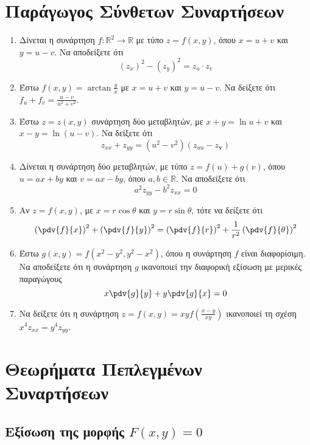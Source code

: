 \section{Παράγωγος Σύνθετων Συναρτήσεων} 

\begin{enumerate}
    \item Δίνεται η συνάρτηση $ f : \mathbb{R}^{2} \to \mathbb{R} $ με τύπο 
        $ z=f(x,y) $, όπου $ x=u+v $ και $ y = u-v $. Να αποδείξετε ότι 
        \[
            (z_{x})^{2} - (z_{y})^{2} = z_{u}\cdot z_{v} 
        \] 
    \item Έστω $ f(x,y) = \arctan{\frac{y}{x}} $ με $ x=u+v $ και $ y = u-v $. 
        Να δείξετε ότι $ f_{u} + f_{v} = \frac{u-v}{u^{2}+v^{2}} $.
    \item Έστω $ z=z(x,y) $ συνάρτηση δύο μεταβλητών, με $ x+y= \ln{u+v} $ και 
        $ x-y = \ln{(u-v)} $. Να δείξετε ότι 
        \[
            z_{xx}+z_{yy} = (u^{2}-v^{2})(z_{uu}-z_{\mathbf{v}}) 
        \]
    \item Δίνεται η συνάρτηση δύο μεταβλητών, με τύπο
        $ z = f(u) + g(v) $, όπου $ u = ax + by $ και $ v = ax - by $, όπου 
        $ a,b \in \mathbb{R} $. Να αποδείξετε ότι 
        \[
            a^{2} z_{yy} - b^{2}z_{xx} = 0 
        \] 
    \item Αν $ z = f(x,y) $, με $ x=r \cos{\theta} $ και $ y = r \sin{\theta} $, 
        τότε να δείξετε ότι
        \[
            \left(\pdv{f}{x}\right)^{2} + \left(\pdv{f}{y}\right)^{2} = 
            \left(\pdv{f}{r}\right)^{2} + \frac{1}{ r^{2}} 
            \left(\pdv{f}{\theta}\right)^{2} 
        \] 
    \item Έστω $ g(x,y) = f(x^{2} - y^{2}, y^{2} - x^{2}) $, όπου η συνάρτηση 
        $f$ είναι διαφορίσιμη. Να αποδείξετε ότι η συνάρτηση $g$ ικανοποιεί 
        την διαφορική εξίσωση με μερικές παραγώγους
        \[
            x\pdv{g}{y} + y\pdv{g}{x} = 0
        \] 
    \item Να δείξετε ότι η συνάρτηση $ z = f(x,y) = xyf\left(\frac{ x-y }{ xy }\right) $
        ικανοποιεί τη σχέση $ x^{4} z_{xx} = y^{4} z_{yy} $.


\end{enumerate}

\section{Θεωρήματα Πεπλεγμένων Συναρτήσεων}

\subsection{Εξίσωση της μορφής \ensuremath{F(x,y)=0}}


